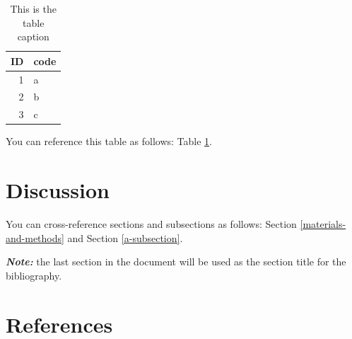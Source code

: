 \documentclass[12pt,halfline,a4paper,]{ouparticle}
\begin{document}
\begin{table}

\caption{\label{tab:tab2}This is the table caption}
\centering
\begin{tabular}[t]{rl}
\toprule
ID & code\\
\midrule
1 & a\\
2 & b\\
3 & c\\
\bottomrule
\end{tabular}
\end{table}

You can reference this table as follows: Table \ref{tab:tab2}.

\hypertarget{discussion}{%
\section{Discussion}\label{discussion}}

You can cross-reference sections and subsections as follows: Section
\ref{materials-and-methods} and Section \ref{a-subsection}.

\textbf{\emph{Note:}} the last section in the document will be used as
the section title for the bibliography.

\hypertarget{references}{%
\section{References}\label{references}}
\end{document}
